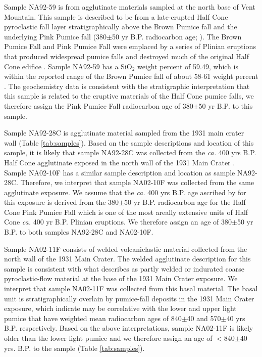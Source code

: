\documentclass[draft]{agujournal2019}
\begin{document}
Sample NA92-59 is from agglutinate materials sampled at the north base of Vent Mountain. This sample is described to be from a late-erupted Half Cone pyroclastic fall layer stratigraphically above the Brown Pumice fall and the underlying Pink Pumice fall (380$\pm$50 yr B.P. radiocarbon age; ). The Brown Pumice Fall and Pink Pumice Fall were emplaced by a series of Plinian eruptions that produced widespread pumice falls and destroyed much of the original Half Cone edifice \cite{Bacon2014a}. Sample NA92-59 has a SiO$_2$ weight percent of 59.49, which is within the reported range of the Brown Pumice fall of about 58-61 weight percent \cite{Bacon2014a}. The geochemistry data is consistent with the stratigraphic interpretation that this sample is related to the eruptive materials of the Half Cone pumice falls, we therefore assign the Pink Pumice Fall radiocarbon age of 380$\pm$50 yr B.P. to this sample.

Sample NA92-28C is agglutinate material sampled from the 1931 main crater wall (Table \ref{tab:samples}). Based on the sample descriptions and location of this sample, it is likely that sample NA92-28C was collected from the \textit{ca.} 400 yrs B.P. Half Cone agglutinate exposed in the north wall of the 1931 Main Crater \cite{Bacon2014a}. Sample NA02-10F has a similar sample description and location as sample NA92-28C. Therefore, we interpret that sample NA02-10F was collected from the same agglutinate exposure. We assume that the \textit{ca.} 400 yrs B.P. age ascribed by \cite{Bacon2014a} for this exposure is derived from the 380$\pm$50 yr B.P. radiocarbon age for the Half Cone Pink Pumice Fall which is one of the most areally extensive units of Half Cone \textit{ca.} 400 yr B.P. Plinian eruptions. We therefore assign an age of 380$\pm$50 yr B.P. to both samples NA92-28C and NA02-10F.

Sample NA02-11F consists of welded volcaniclastic material collected from the north wall of the 1931 Main Crater. The welded agglutinate description for this sample is consistent with what  describes as partly welded or indurated coarse pyroclastic-flow material at the base of the 1931 Main Crater exposure. We interpret that sample NA02-11F was collected from this basal material. The basal unit is stratigraphically overlain by pumice-fall deposits in the 1931 Main Crater exposure, which  indicate may be correlative with the lower and upper light pumice that have weighted mean radiocarbon ages of 840$\pm$40 and 570$\pm$40 yrs B.P. respectively. Based on the above interpretations, sample NA02-11F is likely older than the lower light pumice and we therefore assign an age of $<$840$\pm$40 yrs. B.P. to the sample (Table \ref{tab:samples}). 
\end{document}
